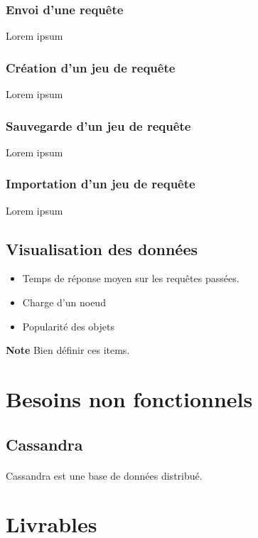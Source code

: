 \documentclass[12pt]{article}
\begin{document}
\subsubsection{Envoi d'une requête}
Lorem ipsum

\subsubsection{Création d'un jeu de requête}
Lorem ipsum

\subsubsection{Sauvegarde d'un jeu de requête}
Lorem ipsum

\subsubsection{Importation d'un jeu de requête}
Lorem ipsum



\subsection{Visualisation des données}

\begin{itemize}
 \item Temps de réponse moyen sur les requêtes passées.
 \item Charge d'un noeud
 \item Popularité des objets
\end{itemize}


\textbf{Note } Bien définir ces items. \newline


\newpage

\section{Besoins non fonctionnels}

\subsection{Cassandra}

\paragraph{} Cassandra est une base de données distribué. 


\newpage

\section{Livrables}
\end{document}
